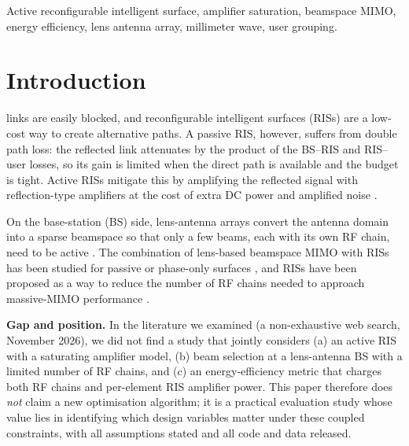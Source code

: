 \documentclass{ieeeaccess}
\begin{document}
\begin{keywords}
Active reconfigurable intelligent surface, amplifier saturation, beamspace MIMO, energy efficiency, lens antenna array, millimeter wave, user grouping.
\end{keywords}

\titlepgskip=-15pt
\maketitle

\section{Introduction}
 links are easily blocked, and reconfigurable intelligent surfaces (RISs) are a low-cost way to create alternative paths. A passive RIS, however, suffers from double path loss: the reflected link attenuates by the product of the BS--RIS and RIS--user losses, so its gain is limited when the direct path is available and the budget is tight. Active RISs mitigate this by amplifying the reflected signal with reflection-type amplifiers at the cost of extra DC power and amplified noise \cite{long2021,zhang2023}.

On the base-station (BS) side, lens-antenna arrays convert the antenna domain into a sparse beamspace so that only a few beams, each with its own RF chain, need to be active \cite{zeng2016,sayeed2013,wang2017,shen2019}. The combination of lens-based beamspace MIMO with RISs has been studied for passive or phase-only surfaces \cite{wanggc2020,liu2021,pal2023,abdullah2025}, and RISs have been proposed as a way to reduce the number of RF chains needed to approach massive-MIMO performance \cite{interdonato2024}.

\textbf{Gap and position.} In the literature we examined (a non-exhaustive web search, November 2026), we did not find a study that jointly considers (a) an active RIS with a saturating amplifier model, (b) beam selection at a lens-antenna BS with a limited number of RF chains, and (c) an energy-efficiency metric that charges both RF chains and per-element RIS amplifier power. This paper therefore does \emph{not} claim a new optimisation algorithm; it is a practical evaluation study whose value lies in identifying which design variables matter under these coupled constraints, with all assumptions stated and all code and data released.
\end{document}
